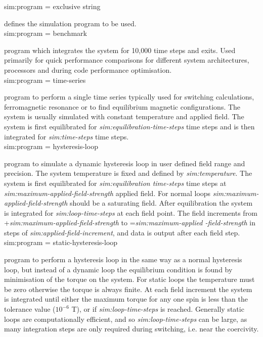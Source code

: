 {\zicf sim:program = exclusive string} defines the simulation program to be used.\\

{\zicf sim:program = benchmark} program which integrates the system for 10,000 time steps and exits. Used primarily for quick performance comparisons for different system architectures, processors and during code performance optimisation.\\

{\zicf sim:program = time-series} program to perform a single time series typically used for switching calculations, ferromagnetic resonance or to find equilibrium magnetic configurations. The system is usually simulated with constant temperature and applied field. The system is first equilibrated for \textit{sim:equilibration-time-steps} time steps and is then integrated for \textit{sim:time-steps} time steps.\\

{\zicf sim:program = hysteresis-loop} program to simulate a dynamic hysteresis loop in user defined field range and precision. The system temperature is fixed and defined by \textit{sim:temperature}. The system is first equilibrated for \textit{sim:equilibration time-steps} time steps at \textit{sim:maximum-applied-field-strength} applied field. For normal loops \textit{sim:maximum-applied-field-strength} should be a saturating field. After equilibration the system is integrated for \textit{sim:loop-time-steps} at each field point. The field increments from +\textit{sim:maximum-applied-field-strength} to =\textit{sim:maximum-applied -field-strength} in steps of \textit{sim:applied-field-increment}, and data is output after each field step.\\

{\zicf sim:program = static-hysteresis-loop} program to perform a hysteresis loop in the same way as a normal hysteresis loop, but instead of a dynamic loop the equilibrium condition is found by minimisation of the torque on the system. For static loops the temperature must be zero otherwise the torque is always finite. At each field increment the system is integrated until either the maximum torque for any one spin is less than the tolerance value ($10^{-6}$ T), or if \textit{sim:loop-time-steps} is reached. Generally static loops are computationally efficient, and so \textit{sim:loop-time-steps} can be large, as many integration steps are only required during switching, i.e. near the coercivity.\\

